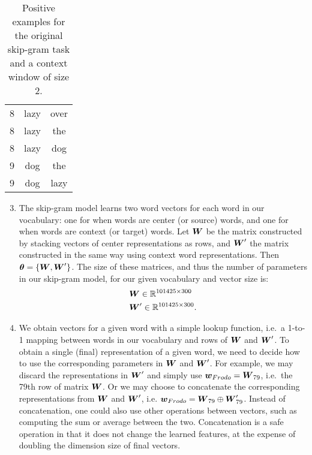 \documentclass[11pt,a4paper]{article}
\begin{document}
\begin{table}[t]
\begin{tabular}{ccc}
        8              & lazy        & over        \\
        8              & lazy        & the         \\
        8              & lazy        & dog         \\
        9              & dog         & the         \\
        9              & dog         & lazy        \\
        \bottomrule
    \end{tabular}
    \caption{
        Positive examples for the original skip-gram task and a context
        window of size 2.
    }
    \label{tab:skipgram_examples}
\end{table}

\begin{enumerate}[label=(\alph*)]
    \setcounter{enumi}{2}
    \item The skip-gram model learns two word vectors for each word in our
          vocabulary: one for when words are center (or source) words, and one
          for when words are context (or target) words.
          Let ${\boldsymbol{W}}$ be the matrix constructed by stacking vectors of center
          representations as rows, and ${\boldsymbol{W}}'$ the matrix constructed in the same
          way using context word representations.
          Then ${\boldsymbol{\theta}}=\{{\boldsymbol{W}}, {\boldsymbol{W}}'\}$.
          The size of these matrices, and thus the number of parameters in our
          skip-gram model, for our given vocabulary and vector size is:
          \begin{align*}
               & {\boldsymbol{W}}\in\mathbb{R}^{101425\times 300}   \\
               & {\boldsymbol{W}}'\in\mathbb{R}^{101425\times 300}.
          \end{align*}
    \item We obtain vectors for a given word with a simple lookup function,
          i.e.\ a 1-to-1 mapping between words in our vocabulary and rows of
          ${\boldsymbol{W}}$ and ${\boldsymbol{W}}'$.
          To obtain a single (final) representation of a given word, we need to
          decide how to use the corresponding parameters in ${\boldsymbol{W}}$ and ${\boldsymbol{W}}'$.
          For example, we may discard the representations in ${\boldsymbol{W}}'$ and simply
          use ${\boldsymbol{w}}_{Frodo} = {\boldsymbol{W}}_{79}$, i.e.\ the 79th row of matrix ${\boldsymbol{W}}$.
          Or we may choose to concatenate the corresponding representations from
          ${\boldsymbol{W}}$ and ${\boldsymbol{W}}'$, i.e. ${\boldsymbol{w}}_{Frodo} = {\boldsymbol{W}}_{79}\oplus{\boldsymbol{W}}'_{79}$.
          Instead of concatenation, one could also use other operations between
          vectors, such as computing the sum or average between the two.
          Concatenation is a safe operation in that it does not change the
          learned features, at the expense of doubling the dimension size of
          final vectors.
\end{enumerate}
\end{document}

